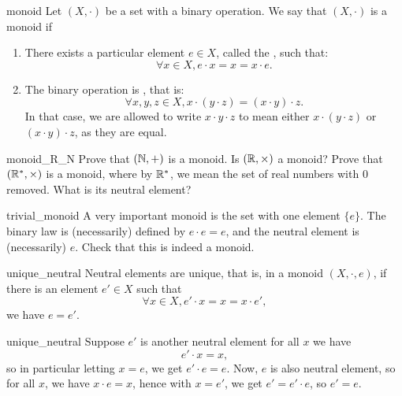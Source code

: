 \begin{cdef}{}{monoid}
    Let \( (X, \cdot) \) be a set with a binary operation. We say that \( (X, \cdot) \) is a monoid if
    \begin{enumerate}
        \item There exists a particular element \( e \in X \), called the , such that:
        \begin{equation*}
            \forall x \in X, e \cdot x = x = x \cdot e.
        \end{equation*}
        \item The binary operation is , that is:
        \begin{equation*}
            \forall x, y, z \in X, x\cdot(y \cdot z) = (x \cdot y) \cdot z.
        \end{equation*}
            In that case, we are allowed to write \( x \cdot y \cdot z  \) to mean either \( x\cdot(y \cdot z) \) or \( (x \cdot y) \cdot z \), as they are equal.
    \end{enumerate}
\end{cdef}

\begin{cex}{}{monoid_R_N}
    Prove that \( (\mathbb{N}, +) \) is a monoid. Is \( (\mathbb{R}, \times) \) a monoid? Prove that \( (\mathbb{R}^*, \times) \) is a monoid, where by \( \mathbb{R}^* \), we mean the set of real numbers with \( 0 \) removed. What is its neutral element?
\end{cex}

\begin{cexp}{}{trivial_monoid}
    A very important monoid is the set with one element \( \{ e \} \). The binary law is (necessarily) defined by \( e \cdot e = e \), and the neutral element is (necessarily) \( e \). Check that this is indeed a monoid.
\end{cexp}

\begin{clem}{}{unique_neutral}
    Neutral elements are unique, that is, in a monoid \( (X, \cdot, e) \), if there is an element \( e' \in X \) such that 
    \begin{equation*}
        \forall x \in X, e' \cdot x = x = x \cdot e',
    \end{equation*}
    we have \( e = e' \).
\end{clem}
\begin{lemproof}{unique_neutral}
    Suppose \( e' \) is another neutral element for all \( x \) we have 
    \begin{equation*}
        e' \cdot x = x, 
    \end{equation*}
    so in particular letting \( x = e \), we get \( e' \cdot e = e \). Now, \( e \) is also neutral element, so for all \( x \), we have \( x \cdot e = x \), hence with \( x = e' \), we get \( e' = e' \cdot e \), so \( e' = e \).
\end{lemproof}

